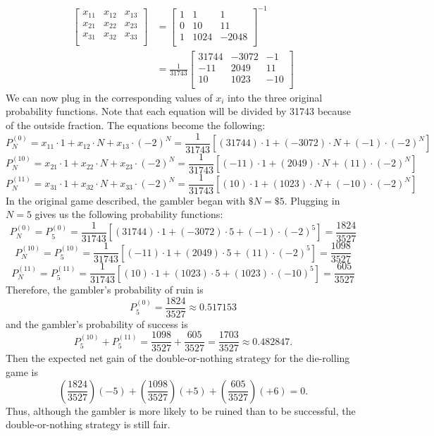 \documentclass[12pt]{article}
\begin{document}
\begin{align}
    \begin{bmatrix}
     x_{11} & x_{12} & x_{13} \\
     x_{21} & x_{22} & x_{23} \\
     x_{31} & x_{32} & x_{33} \\
    \end{bmatrix}
     &=
    \begin{bmatrix}
     1 & 1 & 1 \\
     0 & 10 & 11 \\
     1 & 1024 & -2048 \\
     \end{bmatrix}^{-1} \\
     &=
     \frac{1}{31743}
     \begin{bmatrix}
     31744 & -3072 & -1 \\
     -11 & 2049 & 11 \\
     10 & 1023 & -10 \\
    \end{bmatrix}
\end{align}
We can now plug in the corresponding values of $x_i$ into the three original probability functions.  
Note that each equation will be divided by 31743 because of the outside fraction.  
The equations become the following:
$$P^{(0)}_N = x_{11} \cdot 1 + x_{12} \cdot N + x_{13} \cdot (-2)^N
= \frac{1}{31743}[(31744) \cdot 1 + (-3072) \cdot N + (-1) \cdot (-2)^N]$$
$$P^{(10)}_N = x_{21} \cdot 1 + x_{22} \cdot N + x_{23} \cdot (-2)^N
= \frac{1}{31743}[(-11) \cdot 1 + (2049) \cdot N + (11) \cdot (-2)^N]$$
$$P^{(11)}_N = x_{31} \cdot 1 + x_{32} \cdot N + x_{33} \cdot (-2)^N
= \frac{1}{31743}[(10) \cdot 1 + (1023) \cdot N + (-10) \cdot (-2)^N]$$
In the original game described, the gambler began with $\$N = \$5$.  
Plugging in $N = 5$ gives us the following probability functions:
$$P^{(0)}_N
= P^{(0)}_{5}
= \frac{1}{31743}[(31744) \cdot 1 + (-3072) \cdot 5 + (-1) \cdot (-2)^5]
= \frac{1824}{3527}$$
$$P^{(10)}_N
= P^{(10)}_{5}
= \frac{1}{31743}[(-11) \cdot 1 + (2049) \cdot 5 + (11) \cdot (-2)^5]
= \frac{1098}{3527}$$
$$P^{(11)}_N
= P^{(11)}_{5}
= \frac{1}{31743}[(10) \cdot 1 + (1023) \cdot 5 + (1023) \cdot (-10)^5]
= \frac{605}{3527}$$
Therefore, the gambler's probability of ruin is 
$$P^{(0)}_{5} = \frac{1824}{3527} \approx 0.517153$$ 
and the gambler's probability of success is 
$$P^{(10)}_{5} + P^{(11)}_{5} = \frac{1098}{3527} + \frac{605}{3527} = \frac{1703}{3527} \approx 0.482847.$$
Then the expected net gain of the double-or-nothing strategy for the die-rolling game is
$$ \left( \frac{1824}{3527} \right)(-5) + \left( \frac{1098}{3527} \right)(+5) + \left( \frac{605}{3527} \right)(+6) = 0.$$
Thus, although the gambler is more likely to be ruined than to be successful, the double-or-nothing strategy is still fair.
\end{document}
